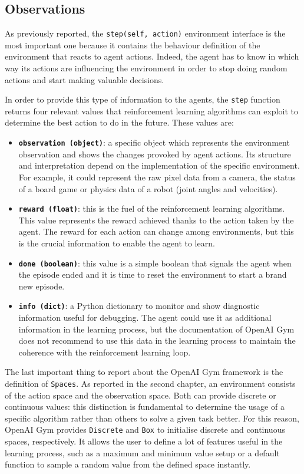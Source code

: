 \subsection{Observations} \label{subsec:observations}

As previously reported, the \texttt{step(self, action)} environment interface is the most important one because it contains the behaviour definition of the environment that reacts to agent actions.
Indeed, the agent has to know in which way its actions are influencing the environment in order to stop doing random actions and start making valuable decisions.

In order to provide this type of information to the agents, the \texttt{step} function returns four relevant values that reinforcement learning algorithms can exploit to determine the best action to do in the future.
These values are:
\begin{itemize}
	\item \textbf{\texttt{observation (object)}}: a specific object which represents the environment observation and shows the changes provoked by agent actions.
Its structure and interpretation depend on the implementation of the specific environment.
For example, it could represent the raw pixel data from a camera, the status of a board game or physics data of a robot (joint angles and velocities).
	\item \textbf{\texttt{reward (float)}}: this is the fuel of the reinforcement learning algorithms.
This value represents the reward achieved thanks to the action taken by the agent.
The reward for each action can change among environments, but this is the crucial information to enable the agent to learn.
	\item \textbf{\texttt{done (boolean)}}: this value is a simple boolean that signals the agent when the episode ended and it is time to reset the environment to start a brand new episode.
	\item \textbf{\texttt{info (dict)}}: a Python dictionary to monitor and show diagnostic information useful for debugging.
The agent could use it as additional information in the learning process, but the documentation of OpenAI Gym does not recommend to use this data in the learning process to maintain the coherence with the reinforcement learning loop.
\end{itemize}

The last important thing to report about the OpenAI Gym framework is the definition of \texttt{Spaces}.
As reported in the second chapter, an environment consists of the action space and the observation space.
Both can provide discrete or continuous values: this distinction is fundamental to determine the usage of a specific algorithm rather than others to solve a given task better.
For this reason, OpenAI Gym provides \texttt{Discrete} and \texttt{Box} to initialise discrete and continuous spaces, respectively.
It allows the user to define a lot of features useful in the learning process, such as a maximum and minimum value setup or a default function to sample a random value from the defined space instantly.

